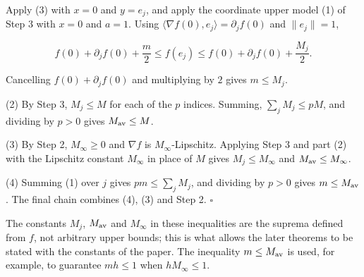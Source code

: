 \documentclass[11pt,a4paper]{report}
\begin{document}
Apply (3) with \(x=0\) and \(y=e_j\), and apply the coordinate upper model (1) of Step 3 with \(x=0\) and \(a=1\). Using \(\langle\nabla f(0),e_j\rangle=\partial_jf(0)\) and \(\|e_j\|=1\),


\[f(0)+\partial_jf(0)+\frac m2\le f(e_j)\le f(0)+\partial_jf(0)+\frac{M_j}2.\]


Cancelling \(f(0)+\partial_jf(0)\) and multiplying by \(2\) gives \(m\le M_j\).




(2) By Step 3, \(M_j\le M\) for each of the \(p\) indices. Summing, \(\sum_jM_j\le pM\), and dividing by \(p>0\) gives \(M_{\rm av}\le M\).




(3) By Step 2, \(M_\infty\ge0\) and \(\nabla f\) is \(M_\infty\)-Lipschitz. Applying Step 3 and part (2) with the Lipschitz constant \(M_\infty\) in place of \(M\) gives \(M_j\le M_\infty\) and \(M_{\rm av}\le M_\infty\).




(4) Summing (1) over \(j\) gives \(pm\le\sum_jM_j\), and dividing by \(p>0\) gives \(m\le M_{\rm av}\). The final chain combines (4), (3) and Step 2. \(\square\)




The constants \(M_j\), \(M_{\rm av}\) and \(M_\infty\) in these inequalities are the suprema defined from \(f\), not arbitrary upper bounds; this is what allows the later theorems to be stated with the constants of the paper. The inequality \(m\le M_{\rm av}\) is used, for example, to guarantee \(mh\le1\) when \(hM_\infty\le1\).
\end{document}
